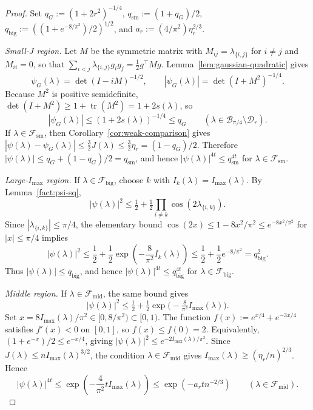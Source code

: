 \documentclass[11pt]{article}
\theoremstyle{definition}
\newcommand{\Bbox}{\mathcal{B}}
\newcommand{\Dd}{\mathcal{D}}
\begin{document}
\begin{proof}
Set \(q_G:=(1+2r^2)^{-1/4}\), \(q_{\mathrm{sm}}:=(1+q_G)/2\), \(q_{\mathrm{big}}:=((1+e^{-8/\pi^2})/2)^{1/2}\), and \(a_r:=(4/\pi^2)\eta_r^{2/3}\).

\emph{Small-\(J\) region.}
Let \(M\) be the symmetric matrix with \(M_{ij}=\lambda_{\{i,j\}}\) for \(i\ne j\)
and \(M_{ii}=0\), so that \(\sum_{i<j}\lambda_{\{i,j\}}g_ig_j=\tfrac12 g^\top Mg\).
Lemma~\ref{lem:gaussian-quadratic} gives
\[
  \psi_G(\lambda)=\det(I-iM)^{-1/2},
  \qquad
  |\psi_G(\lambda)|=\det(I+M^2)^{-1/4}.
\]
Because \(M^2\) is positive semidefinite, \(\det(I+M^2)\ge 1+\operatorname{tr}(M^2)=1+2s(\lambda)\), so
\[
  |\psi_G(\lambda)|\le (1+2s(\lambda))^{-1/4}\le q_G
  \qquad
  (\lambda\in\Bbox_{\pi/4}\setminus\Dd_r).
\]
If \(\lambda\in\mathcal F_{\mathrm{sm}}\), then Corollary~\ref{cor:weak-comparison} gives
\(|\psi(\lambda)-\psi_G(\lambda)|\le \tfrac32 J(\lambda)\le \tfrac32\eta_r=(1-q_G)/2\).
Therefore \(|\psi(\lambda)|\le q_G+(1-q_G)/2=q_{\mathrm{sm}}\), and hence
\(|\psi(\lambda)|^{4t}\le q_{\mathrm{sm}}^{4t}\) for \(\lambda\in\mathcal F_{\mathrm{sm}}\).

\emph{Large-\(I_{\max}\) region.}
If \(\lambda\in\mathcal F_{\mathrm{big}}\), choose \(k\) with \(I_k(\lambda)=I_{\max}(\lambda)\).
By Lemma~\ref{fact:psi-sq},
\[
  |\psi(\lambda)|^2\le \tfrac12+\tfrac12\prod_{i\ne k}\cos(2\lambda_{\{i,k\}}).
\]
Since \(|\lambda_{\{i,k\}}|\le \pi/4\), the elementary bound
\(\cos(2x)\le 1-8x^2/\pi^2\le e^{-8x^2/\pi^2}\) for \(|x|\le \pi/4\)
implies
\[
  |\psi(\lambda)|^2
  \le
  \frac12+\frac12\exp\!\left(-\frac{8}{\pi^2}I_k(\lambda)\right)
  \le
  \frac12+\frac12 e^{-8/\pi^2}
  =q_{\mathrm{big}}^2.
\]
Thus \(|\psi(\lambda)|\le q_{\mathrm{big}}\), and hence
\(|\psi(\lambda)|^{4t}\le q_{\mathrm{big}}^{4t}\) for \(\lambda\in\mathcal F_{\mathrm{big}}\).

\emph{Middle region.}
If \(\lambda\in\mathcal F_{\mathrm{mid}}\), the same bound gives
\[
  |\psi(\lambda)|^2
  \le
  \tfrac12+\tfrac12\exp\!\bigl(-\tfrac{8}{\pi^2}I_{\max}(\lambda)\bigr).
\]
Set \(x=8I_{\max}(\lambda)/\pi^2\in[0,8/\pi^2)\subset[0,1)\). The function \(f(x):=e^{x/4}+e^{-3x/4}\) satisfies \(f'(x)<0\) on \([0,1]\), so \(f(x)\le f(0)=2\). Equivalently, \((1+e^{-x})/2\le e^{-x/4}\), giving \(|\psi(\lambda)|^2\le e^{-2I_{\max}(\lambda)/\pi^2}\).
Since \(J(\lambda)\le nI_{\max}(\lambda)^{3/2}\), the condition
\(\lambda\in\mathcal F_{\mathrm{mid}}\) gives
\(I_{\max}(\lambda)\ge (\eta_r/n)^{2/3}\).
Hence
\[
  |\psi(\lambda)|^{4t}
  \le
  \exp\!\left(-\frac{4}{\pi^2}tI_{\max}(\lambda)\right)
  \le
  \exp\!\left(-a_r t n^{-2/3}\right)
  \qquad (\lambda\in\mathcal F_{\mathrm{mid}}).
\]
\end{proof}
\end{document}
